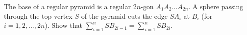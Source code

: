 The base of a regular pyramid is a regular $2n$-gon $A_1A_2...A_{2n}$. A sphere passing through the top vertex $S$ of the pyramid cuts the edge $SA_i$ at $B_i$ (for $i = 1, 2, ... , 2n$). Show that $\sum\limits_{i=1}^n SB_{2i-1} = \sum\limits_{i=1}^n SB_{2i}$.